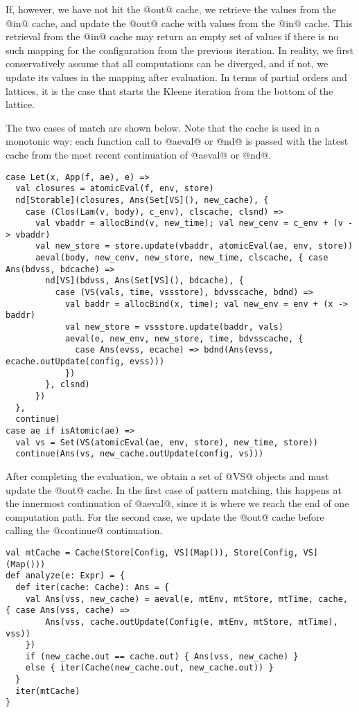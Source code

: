 \documentclass[acmsmall]{acmart}\settopmatter{}
\begin{document}
If, however, we have not hit the @out@ cache, we retrieve the values from the @in@ cache, 
and update the @out@ cache with values from the @in@ cache. This retrieval from the @in@ 
cache may return an empty set of values if there is no such mapping for the configuration 
from the previous iteration.
In reality, we first conservatively assume that all computations can be diverged, and if 
not, we update its values in the mapping after evaluation. In terms of partial orders and 
lattices, it is the case that starts the Kleene iteration from the bottom of the lattice.

The two cases of match are shown below. Note that the cache is used in a monotonic way: 
each function call to @aeval@ or @nd@ is passed with the latest cache from the most recent 
continuation of @aeval@ or @nd@.

\begin{lstlisting}
case Let(x, App(f, ae), e) =>
  val closures = atomicEval(f, env, store)
  nd[Storable](closures, Ans(Set[VS](), new_cache), {
    case (Clos(Lam(v, body), c_env), clscache, clsnd) =>
      val vbaddr = allocBind(v, new_time); val new_cenv = c_env + (v -> vbaddr)
      val new_store = store.update(vbaddr, atomicEval(ae, env, store))
      aeval(body, new_cenv, new_store, new_time, clscache, { case Ans(bdvss, bdcache) =>
        nd[VS](bdvss, Ans(Set[VS](), bdcache), {
          case (VS(vals, time, vssstore), bdvsscache, bdnd) =>
            val baddr = allocBind(x, time); val new_env = env + (x -> baddr)
            val new_store = vssstore.update(baddr, vals)
            aeval(e, new_env, new_store, time, bdvsscache, {
              case Ans(evss, ecache) => bdnd(Ans(evss, ecache.outUpdate(config, evss)))
            })
        }, clsnd)
      })
  },
  continue)
case ae if isAtomic(ae) =>
  val vs = Set(VS(atomicEval(ae, env, store), new_time, store))
  continue(Ans(vs, new_cache.outUpdate(config, vs)))
\end{lstlisting}

After completing the evaluation, we obtain a set of @VS@ objects and must update the @out@ cache.
In the first case of pattern matching, this happens at the innermost continuation of @aeval@,
since it is where we reach the end of one computation path.
For the second case, we update the @out@ cache before calling the @continue@ continuation.

\begin{lstlisting}
val mtCache = Cache(Store[Config, VS](Map()), Store[Config, VS](Map()))
def analyze(e: Expr) = {
  def iter(cache: Cache): Ans = {
    val Ans(vss, new_cache) = aeval(e, mtEnv, mtStore, mtTime, cache, { case Ans(vss, cache) => 
        Ans(vss, cache.outUpdate(Config(e, mtEnv, mtStore, mtTime), vss))
    })
    if (new_cache.out == cache.out) { Ans(vss, new_cache) }
    else { iter(Cache(new_cache.out, new_cache.out)) }
  }
  iter(mtCache)
}
\end{lstlisting}
\end{document}
